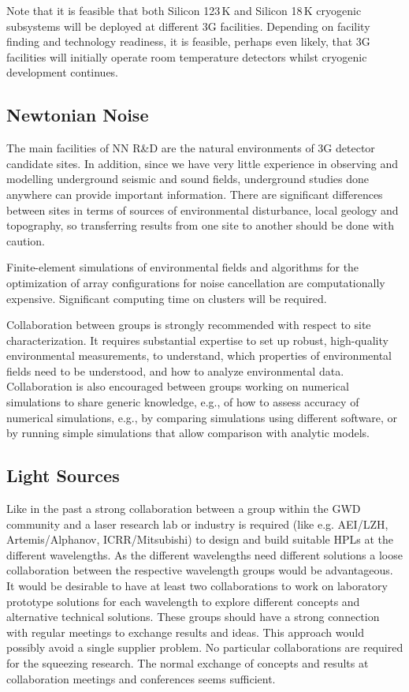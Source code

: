 Note that it is feasible that both Silicon 123\,K and Silicon 18\,K cryogenic subsystems will be deployed at different 3G facilities.  Depending on facility finding and  technology readiness, it is  feasible, perhaps even likely,  that 3G facilities will initially operate room temperature detectors whilst cryogenic development continues.

\subsection{Newtonian Noise}
The main facilities of NN R\&D are the natural environments of 3G detector candidate sites. In addition, since we have very little experience in observing and modelling underground seismic and sound fields, underground studies done anywhere can provide important information. There are significant differences between sites in terms of sources of environmental disturbance, local geology and topography, so transferring results from one site to another should be done with caution.

Finite-element simulations of environmental fields and algorithms for the optimization of array configurations for noise cancellation are computationally expensive. Significant computing time on clusters will be required. 

Collaboration between groups is strongly recommended with respect to site characterization. It requires substantial expertise to set up robust, high-quality environmental measurements, to understand, which properties of environmental fields need to be understood, and how to analyze environmental data. Collaboration is also encouraged between groups working on numerical simulations to share generic knowledge, e.g., of how to assess accuracy of numerical simulations, e.g., by comparing simulations using different software, or by running simple simulations that allow comparison with analytic models.
\subsection{Light Sources}
Like in the past a strong collaboration between a group within the GWD community and a laser research lab or industry is required (like e.g.  AEI/LZH, Artemis/Alphanov, ICRR/Mitsubishi) to design and build suitable HPLs at the different wavelengths. As the different wavelengths need different solutions a loose collaboration between the respective wavelength groups would be advantageous. It would be desirable to have at least two collaborations to work on laboratory prototype solutions for each wavelength to explore different concepts and alternative technical solutions. These groups should have a strong connection with regular meetings to exchange results and ideas. This approach would possibly avoid a single supplier problem.
No particular collaborations are required for the squeezing research. The normal exchange of concepts and results at collaboration meetings and conferences seems sufficient. 

